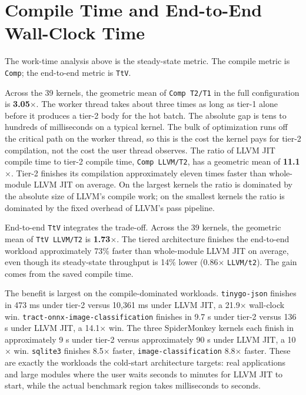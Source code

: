 \section{Compile Time and End-to-End Wall-Clock Time}
\label{sec:eval:tt}

The work-time analysis above is the steady-state metric. The compile metric is \texttt{Comp}; the end-to-end metric is \texttt{TtV}.

Across the 39 kernels, the geometric mean of \texttt{Comp T2/T1} in the full configuration is \textbf{3.05$\times$}. The worker thread takes about three times as long as tier-1 alone before it produces a tier-2 body for the hot batch. The absolute gap is tens to hundreds of milliseconds on a typical kernel. The bulk of optimization runs off the critical path on the worker thread, so this is the cost the kernel pays for tier-2 compilation, not the cost the user thread observes. The ratio of LLVM JIT compile time to tier-2 compile time, \texttt{Comp LLVM/T2}, has a geometric mean of \textbf{11.1$\times$}. Tier-2 finishes its compilation approximately eleven times faster than whole-module LLVM JIT on average. On the largest kernels the ratio is dominated by the absolute size of LLVM's compile work; on the smallest kernels the ratio is dominated by the fixed overhead of LLVM's pass pipeline.

End-to-end \texttt{TtV} integrates the trade-off. Across the 39 kernels, the geometric mean of \texttt{TtV LLVM/T2} is \textbf{1.73$\times$}. The tiered architecture finishes the end-to-end workload approximately 73\% faster than whole-module LLVM JIT on average, even though its steady-state throughput is 14\% lower (0.86$\times$ \texttt{LLVM/t2}). The gain comes from the saved compile time.

The benefit is largest on the compile-dominated workloads. \texttt{tinygo-json} finishes in 473 ms under tier-2 versus 10{,}361 ms under LLVM JIT, a 21.9$\times$ wall-clock win. \texttt{tract-onnx-image-classification} finishes in 9.7 s under tier-2 versus 136 s under LLVM JIT, a 14.1$\times$ win. The three SpiderMonkey kernels each finish in approximately 9 s under tier-2 versus approximately 90 s under LLVM JIT, a 10$\times$ win. \texttt{sqlite3} finishes 8.5$\times$ faster, \texttt{image-classification} 8.8$\times$ faster. These are exactly the workloads the cold-start architecture targets: real applications and large modules where the user waits seconds to minutes for LLVM JIT to start, while the actual benchmark region takes milliseconds to seconds.

